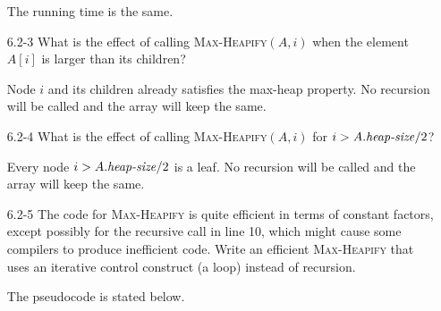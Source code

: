 \begin{enumerate}
\begin{framed}
\begin{algorithm}[H]
\SetAlgoNoEnd\DontPrintSemicolon
\BlankLine
{}
\end{algorithm}

The running time is the same.
\end{framed}

\item[6.2-3]{What is the effect of calling \textsc{Max-Heapify}$(A, i)$ when the
element $A[i]$ is larger than its children?}

\begin{framed}
Node $i$ and its children already satisfies the max-heap property. No recursion
will be called and the array will keep the same.
\end{framed}

\item[6.2-4]{What is the effect of calling \textsc{Max-Heapify}$(A, i)$ for
$i > A.\text{\emph{heap-size}}/2$?}

\begin{framed}
Every node $i > A.\text{\emph{heap-size}}/2$ is a leaf. No recursion will be
called and the array will keep the same.
\end{framed}

\newpage

\item[6.2-5]{The code for \textsc{Max-Heapify} is quite efficient in terms of
constant factors, except possibly for the recursive call in line 10, which might
cause some compilers to produce inefficient code. Write an efficient
\textsc{Max-Heapify} that uses an iterative control construct (a loop) instead
of recursion.}

\begin{framed}
The pseudocode is stated below.


\end{framed}
\end{enumerate}

